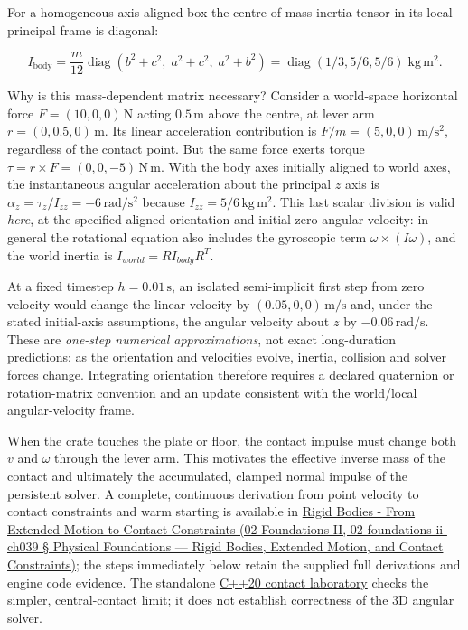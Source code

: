 For a homogeneous axis-aligned box the centre-of-mass inertia tensor in its local principal frame is diagonal:

\[
I_{\mathrm{body}}=\frac{m}{12}\operatorname{diag}(b^2+c^2,\;a^2+c^2,\;a^2+b^2)=\operatorname{diag}(1/3,5/6,5/6)\;\mathrm{kg\,m^2}.
\]

Why is this mass-dependent matrix necessary? Consider a world-space horizontal force \(F=(10,0,0)\,\mathrm N\) acting \(0.5\,\mathrm m\) above the centre, at lever arm \(r=(0,0.5,0)\,\mathrm m\). Its linear acceleration contribution is \(F/m=(5,0,0)\,\mathrm{m/s^2}\), regardless of the contact point. But the same force exerts torque \(\tau=r\times F=(0,0,-5)\,\mathrm{N\,m}\). With the body axes initially aligned to world axes, the instantaneous angular acceleration about the principal \(z\) axis is \(\alpha_z=\tau_z/I_{zz}=-6\,\mathrm{rad/s^2}\) because \(I_{zz}=5/6\,\mathrm{kg\,m^2}\). This last scalar division is valid \emph{here}, at the specified aligned orientation and initial zero angular velocity: in general the rotational equation also includes the gyroscopic term \(\omega\times(I\omega)\), and the world inertia is \(I_{world}=R I_{body}R^T\).

At a fixed timestep \(h=0.01\,\mathrm s\), an isolated semi-implicit first step from zero velocity would change the linear velocity by \((0.05,0,0)\,\mathrm{m/s}\) and, under the stated initial-axis assumptions, the angular velocity about \(z\) by \(-0.06\,\mathrm{rad/s}\). These are \emph{one-step numerical approximations}, not exact long-duration predictions: as the orientation and velocities evolve, inertia, collision and solver forces change. Integrating orientation therefore requires a declared quaternion or rotation-matrix convention and an update consistent with the world/local angular-velocity frame.

When the crate touches the plate or floor, the contact impulse must change both \(v\) and \(\omega\) through the lever arm. This motivates the effective inverse mass of the contact and ultimately the accumulated, clamped normal impulse of the persistent solver. A complete, continuous derivation from point velocity to contact constraints and warm starting is available in \href{}{Rigid Bodies - From Extended Motion to Contact Constraints (02-Foundations-II, 02-foundations-ii-ch039 § Physical Foundations --- Rigid Bodies, Extended Motion, and Contact Constraints)}; the steps immediately below retain the supplied full derivations and engine code evidence. The standalone \href{../../tools/labs/rigid_body_contact_lab.cpp}{C++20 contact laboratory} checks the simpler, central-contact limit; it does not establish correctness of the 3D angular solver.

